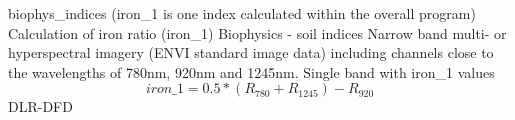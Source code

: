%
{ %
biophys\_indices (iron\_1 is one index calculated within the overall program)
}
%
{ %
Calculation of iron ratio (iron\_1)
}
%
{ %
Biophysics - soil indices
}
%
{ %
Narrow band multi- or hyperspectral imagery (ENVI standard image data) including channels close to the wavelengths of 780nm, 920nm and 1245nm.\bigskip
}
%
{ %
Single band with iron\_1 values
}
%
{ %
\begin{displaymath}
iron\_1 = 0.5 * ( R_{780} + R_{1245} ) - R_{920}
\end{displaymath}
}
%
{ %
DLR-DFD
}
%
{ %

}
